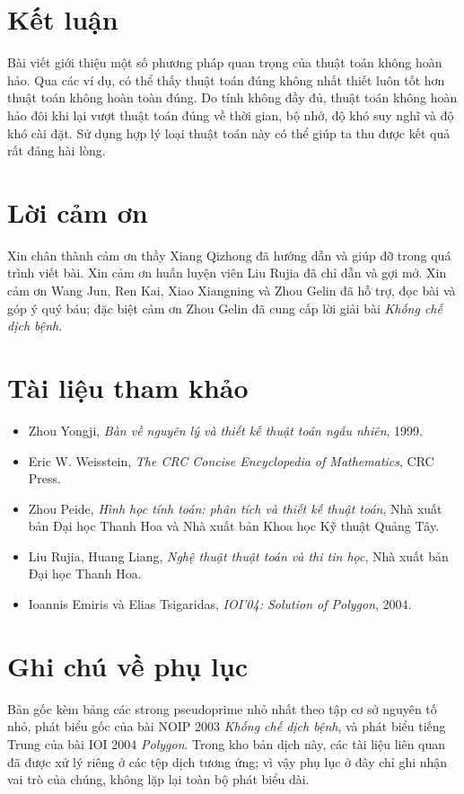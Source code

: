 \documentclass[11pt]{article}
\begin{document}
\section{Kết luận}

Bài viết giới thiệu một số phương pháp quan trọng của thuật toán không hoàn
hảo. Qua các ví dụ, có thể thấy thuật toán đúng không nhất thiết luôn tốt hơn
thuật toán không hoàn toàn đúng. Do tính không đầy đủ, thuật toán không hoàn
hảo đôi khi lại vượt thuật toán đúng về thời gian, bộ nhớ, độ khó suy nghĩ và
độ khó cài đặt. Sử dụng hợp lý loại thuật toán này có thể giúp ta thu được kết
quả rất đáng hài lòng.

\section*{Lời cảm ơn}

Xin chân thành cảm ơn thầy Xiang Qizhong đã hướng dẫn và giúp đỡ trong quá
trình viết bài. Xin cảm ơn huấn luyện viên Liu Rujia đã chỉ dẫn và gợi mở.
Xin cảm ơn Wang Jun, Ren Kai, Xiao Xiangning và Zhou Gelin đã hỗ trợ, đọc bài
và góp ý quý báu; đặc biệt cảm ơn Zhou Gelin đã cung cấp lời giải bài
\textit{Khống chế dịch bệnh}.

\section*{Tài liệu tham khảo}

\begin{itemize}
  \item Zhou Yongji, \textit{Bàn về nguyên lý và thiết kế thuật toán ngẫu
  nhiên}, 1999.
  \item Eric W. Weisstein, \textit{The CRC Concise Encyclopedia of
  Mathematics}, CRC Press.
  \item Zhou Peide, \textit{Hình học tính toán: phân tích và thiết kế thuật
  toán}, Nhà xuất bản Đại học Thanh Hoa và Nhà xuất bản Khoa học Kỹ thuật
  Quảng Tây.
  \item Liu Rujia, Huang Liang, \textit{Nghệ thuật thuật toán và thi tin học},
  Nhà xuất bản Đại học Thanh Hoa.
  \item Ioannis Emiris và Elias Tsigaridas, \textit{IOI'04: Solution of
  Polygon}, 2004.
\end{itemize}

\appendix
\section{Ghi chú về phụ lục}

Bản gốc kèm bảng các strong pseudoprime nhỏ nhất theo tập cơ sở nguyên tố nhỏ,
phát biểu gốc của bài NOIP 2003 \textit{Khống chế dịch bệnh}, và phát biểu
tiếng Trung của bài IOI 2004 \textit{Polygon}. Trong kho bản dịch này, các tài
liệu liên quan đã được xử lý riêng ở các tệp dịch tương ứng; vì vậy phụ lục ở
đây chỉ ghi nhận vai trò của chúng, không lặp lại toàn bộ phát biểu dài.
\end{document}
